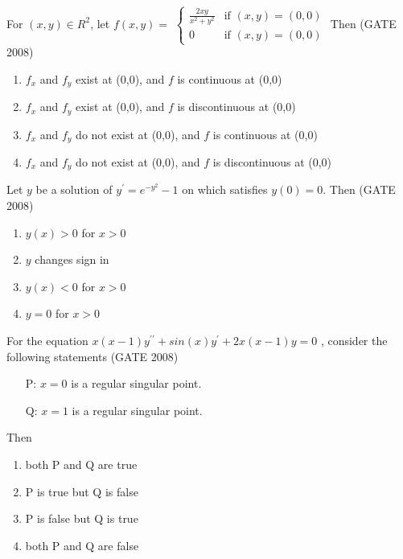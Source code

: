 \item {
For $(x, y) \in R^2$, let
$f(x,y) =$ $\begin{cases}\frac{2xy}{x^2+y^2} & \text{if } (x,y)=(0,0)\\
    0 & \text{if } (x, y)=(0,0)
\end{cases}$
Then \hfill (GATE 2008)

\begin{enumerate}
    \item $f_x$ and $f_y$ exist at (0,0), and $f$ is continuous at (0,0) 
    \item $f_x$ and $f_y$ exist at (0,0), and $f$ is discontinuous at (0,0)
    \item $f_x$ and $f_y$ do not exist at (0,0), and $f$ is continuous at (0,0)
    \item $f_x$ and $f_y$ do not exist at (0,0), and $f$ is discontinuous at (0,0)
\end{enumerate}
}

\item { Let $y$ be a solution of $y^\prime=e^{-y^2}-1$ on  which satisfies $y(0) = 0$. Then \hfill (GATE 2008)
\begin{multicols}{2}
\begin{enumerate}
    \item $y(x)>0$ for $x>0$
    \item $y$ changes sign in 
    \item $y(x) <0$ for $x>0 $
    \item $y=0$ for $x>0$
\end{enumerate}
\end{multicols}
}

\item{ For the equation $x(x-1)y^{\prime\prime}+sin(x)y^\prime+2x(x-1)y=0$ , consider the following statements  \hfill (GATE 2008)
    \begin{itemize}
        \item[P:] $x=0$ is a regular singular point. 
        \item[Q:] $x=1$ is a regular singular point.
    \end{itemize}
    
Then
\begin{multicols}{2}
\begin{enumerate}
    \item both P and Q are true
    \item P is true but Q is false
    \item P is false but Q is true
    \item both P and Q are false
\end{enumerate}
\end{multicols}
}

